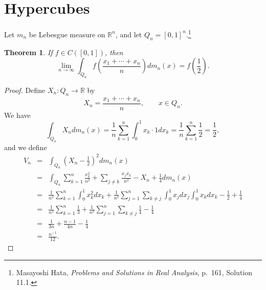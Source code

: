 \documentclass{article}
\newtheorem{theorem}{Theorem}
\theoremstyle{definition}
\begin{document}
\section{Hypercubes}
Let $m_n$ be Lebesgue measure on $\mathbb{R}^n$, and let $Q_n=[0,1]^n$.\footnote{Masayoshi Hata, {\em Problems and Solutions in Real
Analysis}, p.~161, Solution 11.1.}

\begin{theorem}
If $f \in C([0,1])$, then
\[
\lim_{n \to \infty} \int_{Q_n} f\left(\frac{x_1+\cdots+x_n}{n}\right) dm_n(x) = f\left(\frac{1}{2}\right).
\]
\end{theorem}
\begin{proof}
Define $X_n:Q_n \to \mathbb{R}$ by 
\[
X_n = \frac{x_1+\cdots+x_n}{n}, \qquad x \in Q_n.
\]
We have
\[
\int_{Q_n} X_n dm_n(x)=\frac{1}{n} \sum_{k=1}^n \int_0^1 x_k \cdot 1 dx_k
=\frac{1}{n} \sum_{k=1}^n \frac{1}{2}
=\frac{1}{2},
\]
and we define
\begin{eqnarray*}
V_n&=&\int_{Q_n} \left(X_n-\frac{1}{2} \right)^2 dm_n(x)\\
&=&\int_{Q_n} \sum_{k=1}^n \frac{x_k^2}{n^2} + \sum_{j \neq k} \frac{x_j x_k}{n^2} - X_n + \frac{1}{4} dm_n(x)\\
&=&\frac{1}{n^2} \sum_{k=1}^n \int_0^1 x_k^2 dx_k +  \frac{1}{n^2} \sum_{j=1}^n \sum_{k \neq j} \int_0^1 x_j dx_j  \int_0^1 x_k dx_k
-\frac{1}{2}+\frac{1}{4}\\
&=&\frac{1}{n^2} \sum_{k=1}^n \frac{1}{3} + \frac{1}{n^2} \sum_{j=1}^n \sum_{k \neq j} \frac{1}{4} -\frac{1}{4}\\
&=&\frac{1}{3n}+\frac{n-1}{4n} - \frac{1}{4}\\
&=&\frac{n^{-1}}{12}.
\end{eqnarray*}


\end{proof}
\end{document}
